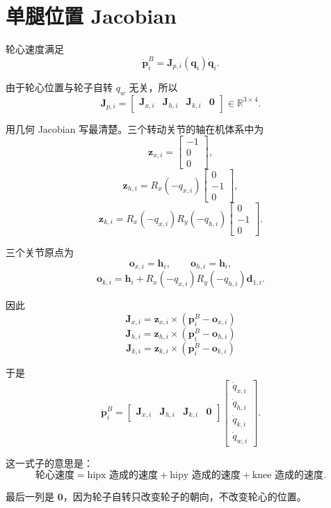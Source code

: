 \documentclass[UTF8,11pt,a4paper]{ctexart}
\newcommand{\R}{\mathbb{R}}
\newcommand{\bs}[1]{\bm{#1}}
\newcommand{\rx}{R_x}
\newcommand{\ry}{R_y}
\begin{document}
\section{单腿位置 Jacobian}

轮心速度满足
\[
\dot{\bs p}_i^B
=
\bs J_{p,i}(\bs q_i)\dot{\bs q}_i.
\]

由于轮心位置与轮子自转 \(q_w\) 无关，所以
\[
\bs J_{p,i}
=
\begin{bmatrix}
\bs J_{x,i} & \bs J_{h,i} & \bs J_{k,i} & \bs 0
\end{bmatrix}
\in \R^{3\times 4}.
\]

用几何 Jacobian 写最清楚。三个转动关节的轴在机体系中为
\[
\bs z_{x,i} =
\begin{bmatrix}-1\\0\\0\end{bmatrix},
\]
\[
\bs z_{h,i} =
\rx(-q_{x,i})
\begin{bmatrix}0\\-1\\0\end{bmatrix},
\]
\[
\bs z_{k,i} =
\rx(-q_{x,i})\ry(-q_{h,i})
\begin{bmatrix}0\\-1\\0\end{bmatrix}.
\]

三个关节原点为
\[
\bs o_{x,i}=\bs h_i,
\qquad
\bs o_{h,i}=\bs h_i,
\]
\[
\bs o_{k,i}
=
\bs h_i
+\rx(-q_{x,i})\ry(-q_{h,i})\bs d_{1,i}.
\]

因此
\[
\boxed{
\bs J_{x,i}
=
\bs z_{x,i}\times(\bs p_i^B-\bs o_{x,i})
}
\]
\[
\boxed{
\bs J_{h,i}
=
\bs z_{h,i}\times(\bs p_i^B-\bs o_{h,i})
}
\]
\[
\boxed{
\bs J_{k,i}
=
\bs z_{k,i}\times(\bs p_i^B-\bs o_{k,i})
}
\]

于是
\[
\boxed{
\dot{\bs p}_i^B
=
\begin{bmatrix}
\bs J_{x,i} & \bs J_{h,i} & \bs J_{k,i} & \bs 0
\end{bmatrix}
\begin{bmatrix}
\dot q_{x,i}\\
\dot q_{h,i}\\
\dot q_{k,i}\\
\dot q_{w,i}
\end{bmatrix}.
}
\]

这一式子的意思是：
\[
\text{轮心速度}
=
\text{hipx 造成的速度}
+\text{hipy 造成的速度}
+\text{knee 造成的速度}.
\]

最后一列是 \(\bs 0\)，因为轮子自转只改变轮子的朝向，不改变轮心的位置。
\end{document}
